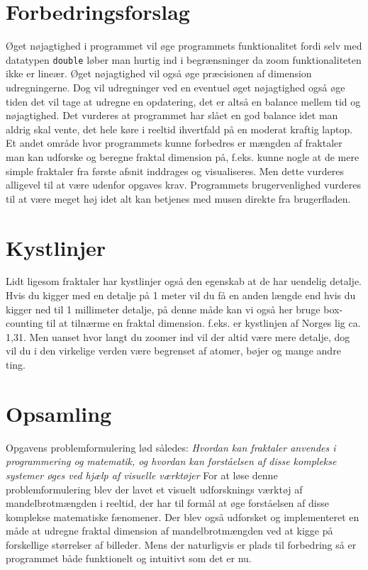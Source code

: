 \documentclass{article}
\begin{document}
\section{Forbedringsforslag}
Øget nøjagtighed i programmet vil øge programmets funktionalitet fordi selv med datatypen \texttt{double} løber man hurtig ind i begrænsninger da zoom funktionaliteten ikke er lineær. Øget nøjagtighed vil også øge præcisionen af dimension udregningerne. Dog vil udregninger ved en eventuel øget nøjagtighed også øge tiden det vil tage at udregne en opdatering, det er altså en balance mellem tid og nøjagtighed. Det vurderes at programmet har slået en god balance idet man aldrig skal vente, det hele køre i reeltid ihvertfald på en moderat kraftig laptop. Et andet område hvor programmets kunne forbedres er mængden af fraktaler man kan udforske og beregne fraktal dimension på, f.eks. kunne nogle at de mere simple fraktaler fra første afsnit inddrages og visualiseres. Men dette vurderes alligevel til at være udenfor opgaves krav. Programmets brugervenlighed vurderes til at være meget høj idet alt kan betjenes med musen direkte fra brugerfladen.
\section{Kystlinjer}
Lidt ligesom fraktaler har kystlinjer også den egenskab at de har uendelig detalje. Hvis du kigger med en detalje på 1 meter vil du få en anden længde end hvis du kigger ned til 1 millimeter detalje, på denne måde kan vi også her bruge box-counting til at tilnærme en fraktal dimension. f.eks. er kystlinjen af Norges lig ca. 1,31. \parencite{article} Men uanset hvor langt du zoomer ind vil der altid være mere detalje, dog vil du i den virkelige verden være begrenset af atomer, bøjer og mange andre ting.
\section{Opsamling}
Opgavens problemformulering lød således: \textit{Hvordan kan fraktaler anvendes i programmering og matematik, og hvordan kan forståelsen af disse komplekse systemer øges ved hjælp af visuelle værktøjer} For at løse denne problemformulering blev der lavet et visuelt udforsknings værktøj af mandelbrotmængden i reeltid, der har til formål at øge forståelsen af disse komplekse matematiske fænomener. Der blev også udforsket og implementeret en måde at udregne fraktal dimension af mandelbrotmængden ved at kigge på forskellige størrelser af billeder. Mens der naturligvis er plads til forbedring så er programmet både funktionelt og intuitivt som det er nu.
\newpage
\printbibliography
\newpage
\end{document}
